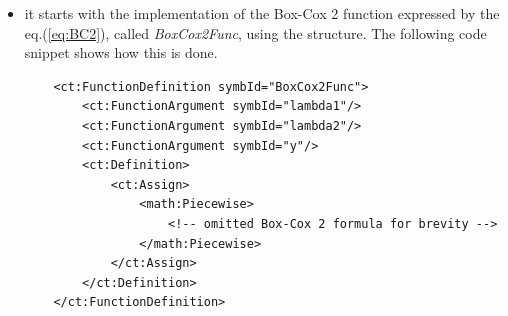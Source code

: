 \begin{itemize}
\item 
it starts with the implementation of the Box-Cox 2 function expressed by 
the eq.(\ref{eq:BC2}), called \textit{BoxCox2Func}, using the  
structure. The following code snippet shows how this is done.

\lstset{language=XML}
\begin{lstlisting}
    <ct:FunctionDefinition symbId="BoxCox2Func">
        <ct:FunctionArgument symbId="lambda1"/>
        <ct:FunctionArgument symbId="lambda2"/>
        <ct:FunctionArgument symbId="y"/>
        <ct:Definition>
            <ct:Assign>
                <math:Piecewise>
                    <!-- omitted Box-Cox 2 formula for brevity -->
                </math:Piecewise>
            </ct:Assign>
        </ct:Definition>
    </ct:FunctionDefinition>
\end{lstlisting}



\end{itemize}
